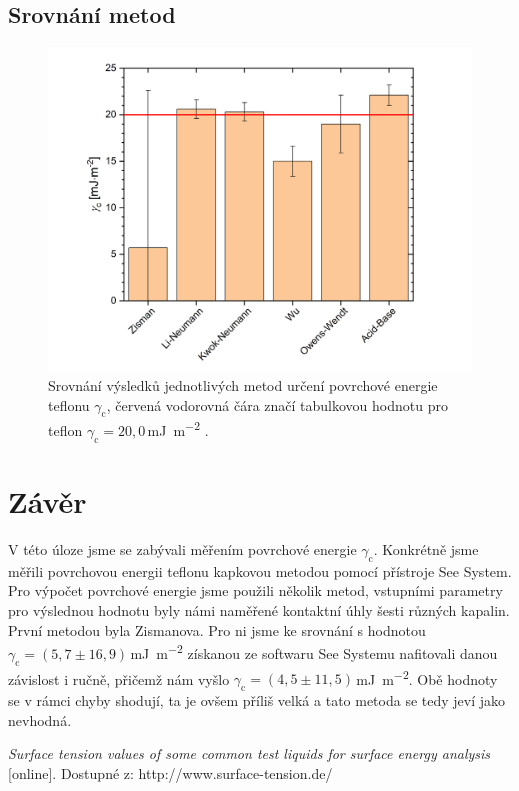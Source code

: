 \documentclass{protokol}
\begin{document}
\subsection{Srovnání metod}

\begin{figure}[h!]
	\centering
	\includegraphics[width=130mm]{srovnani.png}
	\caption{Srovnání výsledků jednotlivých metod určení povrchové energie 
	teflonu $\gamma_{\text{c}}$, červená vodorovná čára značí tabulkovou 
	hodnotu pro teflon $\gamma_{\text{c}} = 
	20,0$\,\si{\milli\joule\per\meter\squared} \cite{napetiKapalin}.}
	\label{graph:srovnani}
\end{figure}








\section{Závěr}
V této úloze jsme se zabývali měřením povrchové energie  $\gamma_{\text{c}}$. Konkrétně jsme měřili povrchovou energii teflonu kapkovou metodou pomocí přístroje See System. Pro výpočet povrchové energie jsme použili několik metod, vstupními parametry pro výslednou hodnotu byly námi naměřené kontaktní úhly šesti různých kapalin. První metodou byla Zismanova. Pro ni jsme ke srovnání s hodnotou $\gamma_{\text{c}} = (5,7\pm16,9)$\,\si{\milli\joule\per\meter\squared} získanou ze softwaru See Systemu nafitovali danou závislost i ručně, přičemž nám vyšlo $\gamma_{\text{c}} = 
(4,5\pm11,5)$\,\si{\milli\joule\per\meter\squared}. Obě hodnoty se v rámci chyby shodují, ta je ovšem příliš velká a tato metoda se tedy jeví jako nevhodná.


\begin{thebibliography}{10}
	 {\textit{Surface tension values of some common test 
	liquids 
	for surface energy analysis} [online]. Dostupné z: 
	http://www.surface-tension.de/}
	
\end{thebibliography}
\end{document}
